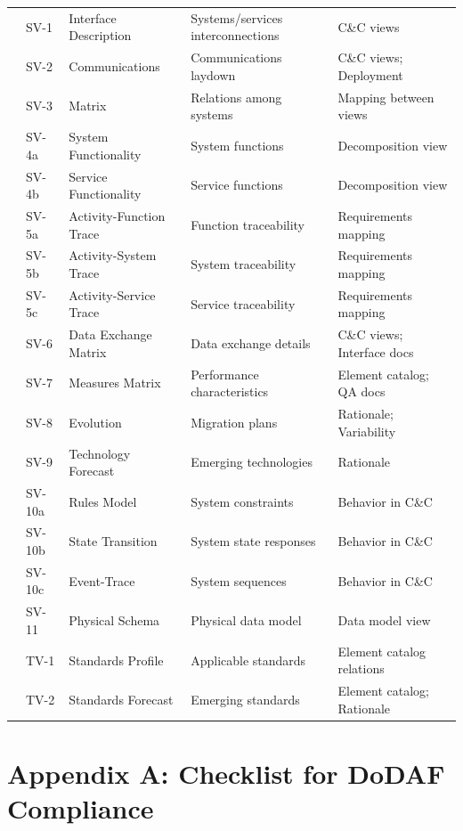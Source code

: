 \documentclass[11pt]{article}
\begin{document}
\begin{longtable}{@{}L{1.2cm} L{1cm} L{3cm} L{3.5cm} L{3.8cm}@{}}
& SV-1 & Interface Description & Systems/services interconnections & C\&C views \\
& SV-2 & Communications & Communications laydown & C\&C views; Deployment \\
& SV-3 & Matrix & Relations among systems & Mapping between views \\
& SV-4a & System Functionality & System functions & Decomposition view \\
& SV-4b & Service Functionality & Service functions & Decomposition view \\
& SV-5a & Activity-Function Trace & Function traceability & Requirements mapping \\
& SV-5b & Activity-System Trace & System traceability & Requirements mapping \\
& SV-5c & Activity-Service Trace & Service traceability & Requirements mapping \\
& SV-6 & Data Exchange Matrix & Data exchange details & C\&C views; Interface docs \\
& SV-7 & Measures Matrix & Performance characteristics & Element catalog; QA docs \\
& SV-8 & Evolution & Migration plans & Rationale; Variability \\
& SV-9 & Technology Forecast & Emerging technologies & Rationale \\
& SV-10a & Rules Model & System constraints & Behavior in C\&C \\
& SV-10b & State Transition & System state responses & Behavior in C\&C \\
& SV-10c & Event-Trace & System sequences & Behavior in C\&C \\
& SV-11 & Physical Schema & Physical data model & Data model view \\
\midrule

& TV-1 & Standards Profile & Applicable standards & Element catalog relations \\
& TV-2 & Standards Forecast & Emerging standards & Element catalog; Rationale \\

\end{longtable}

\section{Appendix A: Checklist for DoDAF Compliance}
\end{document}
